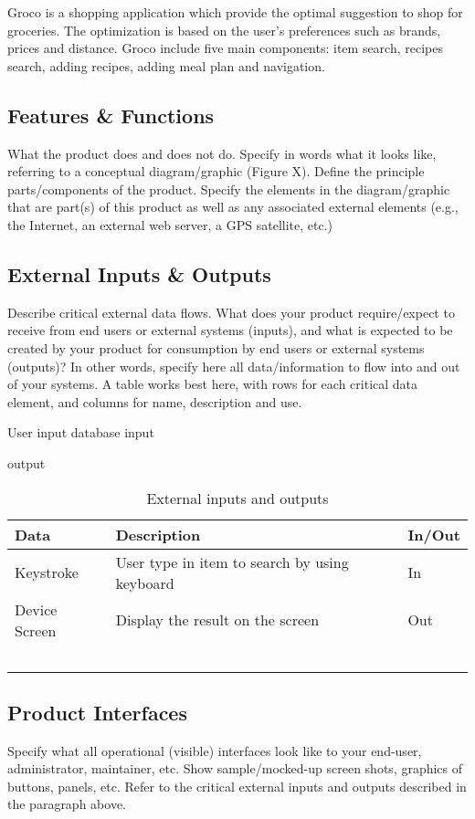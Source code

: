 Groco is a shopping application which provide the optimal suggestion to shop for groceries. The optimization is based on the user's preferences such as brands, prices and distance. Groco include five main components: item search, recipes search, adding recipes, adding meal plan and navigation.

\subsection{Features \& Functions}
What the product does and does not do. Specify in words what it looks like, referring to a conceptual diagram/graphic (Figure X).  Define the principle parts/components of the product. Specify the elements in the diagram/graphic that are part(s) of this product as well as any associated external elements (e.g., the Internet, an external web server, a GPS satellite, etc.)

\subsection{External Inputs \& Outputs}
Describe critical external data flows. What does your product require/expect to receive from end users or external systems (inputs), and what is expected to be created by your product for consumption by end users or external systems (outputs)? In other words, specify here all data/information to flow into and out of your systems. A table works best here, with rows for each critical data element, and columns for name, description and use.

User input
database input

output
\begin{table}[]
\centering
\begin{tabular}{|l|l|l|}
\hline
Data      & Description                                   & In/Out \\
\hline
Keystroke & User type in item to search by using keyboard & In     \\
\hline
Device Screen      & Display the result on the screen                                              & Out       \\
\hline
          &                                               &        \\
\hline
          &                                               &        \\
\hline
          &                                               &        \\
\hline
          &                                               &        \\
\hline
          &                                               &        \\
\hline
\end{tabular}
\caption{External inputs and outputs}
\end{table}


\subsection{Product Interfaces}
Specify what all operational (visible) interfaces look like to your end-user, administrator, maintainer, etc. Show sample/mocked-up screen shots, graphics of buttons, panels, etc. Refer to the critical external inputs and outputs described in the paragraph above.
